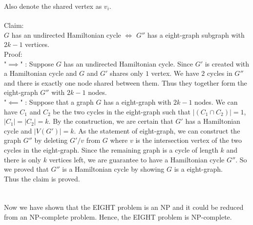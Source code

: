 \documentclass[11pt]{article}
\begin{document}
\begin{solution}
    Also denote the shared vertex as $v_i$.\\
    \\
    Claim: \\
    $G$ has an undirected Hamiltonian cycle $\iff$ $G''$ has a eight-graph subgraph with $2k-1$ vertices.\\
    Proof:\\
    "$\implies$" : Suppose $G$ has an undirected Hamiltonian cycle. Since $G'$ is created with a Hamiltonian cycle and $G$ and $G'$ shares only $1$ vertex. We have $2$ cycles in $G''$  and there is exactly one node shared between them. Thus they together form the eight-graph $G''$ with $2k-1$ nodes. \\
    "$\impliedby$" : Suppose that a graph $G$ has a eight-graph with $2k-1$ nodes. We can have $C_1$ and $C_2$ be the two cycles in the eight-graph such that $|(C_1 \cap C_2)| = 1$, $|C_1| = |C_2| = k$. By the construction, we are certain that $G'$ has a Hamiltonian cycle and $|V(G')| = k$. As the statement of eight-graph, we can construct the graph $G''$ by deleting $G'/v$ from $G$ where $v$ is the intersection vertex of the two cycles in the eight-graph. Since the remaining graph is a cycle of length $k$ and there is only $k$ vertices left, we are guarantee to have a Hamiltonian cycle $G''$. So we proved that $G''$ is a Hamiltonian cycle by showing $G$ is a eight-graph.\\
    Thus the claim is proved.\\
    \\
    \\
    Now we have shown that the EIGHT problem is an NP and it could be reduced from an NP-complete problem. Hence, the EIGHT problem is NP-complete.
\end{solution}
\end{document}
